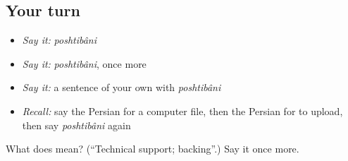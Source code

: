 \subsection*{Your turn}
\begin{itemize}
\raggedright
  \item \emph{Say it:} \emph{poshtibâni}
  \item \emph{Say it:} \emph{poshtibâni}, once more
  \item \emph{Say it:} a sentence of your own with \emph{poshtibâni}
  \item \emph{Recall:} say the Persian for a computer file, then the Persian for to upload, then say \emph{poshtibâni} again
\end{itemize}

\begin{tcolorbox}[breakable,colback=teal!4,colframe=teal!35!black,title={Before you move on}]
What does  mean? (\textquotedblleft{}Technical support; backing\textquotedblright{}.) Say it once more.
\end{tcolorbox}
